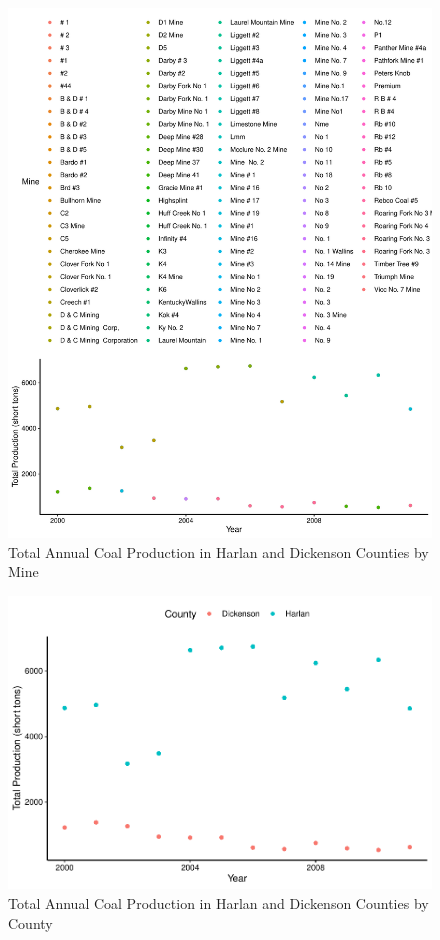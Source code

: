 \documentclass[12pt,]{article}
\begin{document}
\begin{figure}
\centering
\includegraphics{Smith_ENV872_Project_files/figure-latex/unnamed-chunk-10-1.pdf}
\caption{\label{fig:figs} Total Annual Coal Production in Harlan and
Dickenson Counties by Mine}
\end{figure}

\begin{figure}
\centering
\includegraphics{Smith_ENV872_Project_files/figure-latex/unnamed-chunk-11-1.pdf}
\caption{\label{fig:figs} Total Annual Coal Production in Harlan and
Dickenson Counties by County}
\end{figure}
\end{document}

